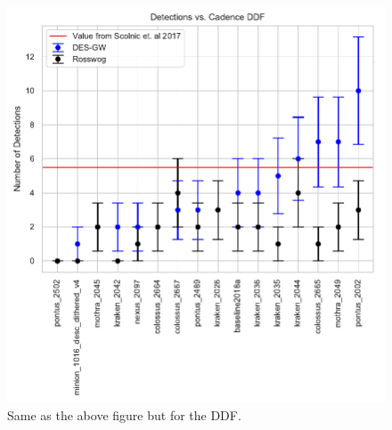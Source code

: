 \begin{figure}[h!]
  \centering
  \includegraphics[scale=0.7]{figures/ddf_detection_counts_by_cadence}
  \caption{Same as the above figure but for the DDF.}
  \label{fig:cadence_ranking_ddf}
\end{figure}

\FloatBarrier
